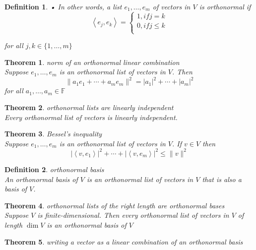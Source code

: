\documentclass{article}
\newtheorem{theorem}{Theorem}[subsection]
\newtheorem{definition}{Definition}[subsection]
\newcommand{\FF}{\mathbb{F}}
\begin{document}
\begin{CJK}{UTF8}{gkai}
\begin{definition}
    • In other words, a list $e_1,\ldots,e_m$ of vectors in $V$ is orthonormal if
    \[\left<e_j,e_k\right> = \begin{cases}
        1 , if j = k\\
        0 , if j \leq k\\
    \end{cases}\]

    for all $j, k \in \{1,\ldots,m\}$
\end{definition}

\begin{theorem}
    norm of an orthonormal linear combination\\

    Suppose $e_1,\ldots,e_m$ is an orthonormal list of vectors in $V$. Then
    \[\|a_1e_1 + \cdots+a_me_m\|^2 = |a_1|^2 + \cdots+|a_m|^2\]
    for all $a_1, \ldots,a_m \in \FF$
\end{theorem}

\begin{theorem}
    orthonormal lists are linearly independent\\

    Every orthonormal list of vectors is linearly independent.
\end{theorem}

\begin{theorem}
    Bessel's inequality\\

    Suppose $e_1,\ldots,e_m$ is an orthonormal list of vectors in $V$. If $v \in V$ then
    \[|\left<v, e_1\right>|^2 + \cdots + |\left<v,e_m\right>|^2 \leq \|v\|^2\]
\end{theorem}

\begin{definition}
    orthonormal basis\\

    An orthonormal basis of $V$ is an orthonormal list of vectors in $V$ that is also a basis of $V$.
\end{definition}

\begin{theorem}
    orthonormal lists of the right length are orthonormal bases\\

    Suppose $V$ is finite-dimensional. Then every orthonormal list of vectors in $V$ of length $\dim V$ is an orthonormal basis of $V$
\end{theorem}

\begin{theorem}
    writing a vector as a linear combination of an orthonormal basis\\


\end{theorem}
\end{CJK}
\end{document}
